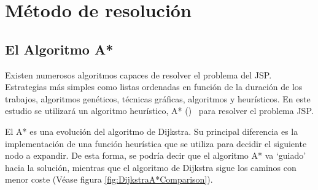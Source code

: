 
\section{Método de resolución}

\subsection{El Algoritmo A*}

Existen numerosos algoritmos capaces de resolver el problema del JSP\@.
Estrategias más simples como listas ordenadas en función de la duración
de los trabajos, algoritmos genéticos, técnicas gráficas,
algoritmos  y heurísticos.
En este estudio se utilizará un algoritmo heurístico, A* ()~\cite{HNR68}
para resolver el problema JSP\@.

El A* es una evolución del algoritmo de Dijkstra.
Su principal diferencia es la implementación de una función heurística
que se utiliza para decidir el siguiente nodo a expandir.
De esta forma, se podría decir que el algoritmo A* va `guiado'
hacia la solución, mientras que el algoritmo de Dijkstra
sigue los caminos con menor coste (Véase figura \ref{fig:DijkstraA*Comparison}).

